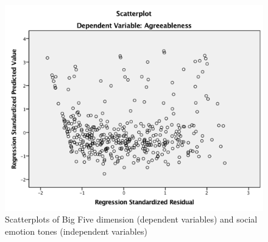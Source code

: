 \documentclass[graybox]{svmult}
\begin{document}
{\begin{figure}[!ht]
\includegraphics[width=0.45\columnwidth]{images/agreeablenessplot.png}
\caption{Scatterplots of Big Five dimension (dependent variables) and
  social emotion tones (independent variables)}
\label{fig:scatterplots} 
\end{figure}


\begin{table}[!ht]
\centering
{}
\end{table}}
\end{document}
